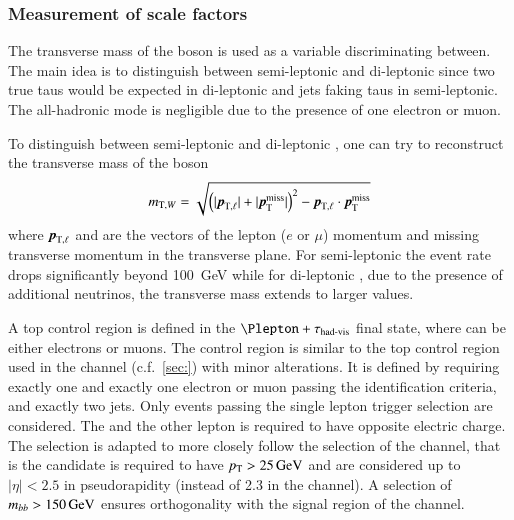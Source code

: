 \subsubsection{Measurement of scale factors}

The transverse mass of the \PW boson is used as a variable
discriminating between. The main idea is to distinguish between
semi-leptonic and di-leptonic \ttbar since two true taus would be
expected in di-leptonic and jets faking taus in semi-leptonic. The
all-hadronic mode is negligible due to the presence of one electron or
muon.

To distinguish between semi-leptonic and di-leptonic \ttbar, one can
try to reconstruct the transverse mass of the \PW boson
\begin{align*}
  \mTW = \sqrt{\left( | \myvec{p}_{\text{T}, \ell} | + | \pTmiss | \right)^2
               - \myvec{p}_{\text{T}, \ell} \cdot \pTmiss}
\end{align*}
where $\myvec{p}_{\text{T}, \ell}$ and \pTmiss are the vectors of the
lepton ($e$ or $\mu$) momentum and missing transverse momentum in the
transverse plane. For semi-leptonic \ttbar the event rate drops
significantly beyond \SI{100}{\GeV} while for di-leptonic \ttbar, due
to the presence of additional neutrinos, the transverse mass extends
to larger values.

A top control region is defined in the $\Plepton + \tauhadvis$ final
state, where \Plepton can be either electrons or muons. The control
region is similar to the top control region used in the \lephad
channel (c.f.\ \cref{sec:}) with minor alterations. It is defined by
requiring exactly one \tauhadvis and exactly one electron or muon
passing the identification criteria, and exactly two
\btagged jets. Only events passing the single lepton trigger selection
are considered. The \tauhadvis and the other lepton is required to
have opposite electric charge. The \tauhadvis selection is adapted to
more closely follow the selection of the \hadhad channel, that is the
\tauhadvis candidate is required to have $p_{\text{T}} > \SI{25}{\ensuremath{\text{GeV}}}$ and
\tauhadvis are considered up to $|\eta| < 2.5$ in pseudorapidity
(instead of 2.3 in the \lephad channel). A selection of
$m_{bb} > \SI{150}{\ensuremath{\text{GeV}}}$ ensures orthogonality with the signal region
of the \lephad channel.


